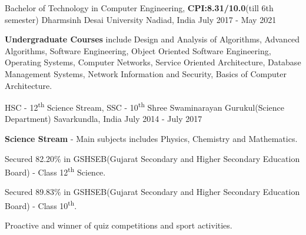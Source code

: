 
\begin{cventries}
  \cventry
    {Bachelor of Technology in Computer Engineering, \textbf{CPI:8.31/10.0}(till 6th semester)} %
    {Dharmsinh Desai University} %
    {Nadiad, India} %
    {July 2017 - May 2021} %
    {
      \begin{cvitems} %
         \item {\textbf{Undergraduate Courses} include Design and Analysis of Algorithms, Advanced Algorithms, Software Engineering, Object Oriented
Software Engineering, Operating Systems, Computer Networks, Service Oriented Architecture, Database Management Systems,
Network Information and Security, Basics of Computer Architecture.}
         \vspace{0.5mm}
      \end{cvitems}
    }
    
\end{cventries}
\begin{cventries}
  \cventry
    {HSC - 12\textsuperscript{th} Science Stream, SSC - 10\textsuperscript{th}} %
    {Shree Swaminarayan Gurukul(Science Department)} %
    {Savarkundla, India} %
    {July 2014 - July 2017} %
    {
      \begin{cvitems} %
         \item {\textbf{Science Stream} -  Main subjects includes Physics, Chemistry and Mathematics.}
         \vspace{0.5mm}
          \item {Secured 82.20\% in GSHSEB(Gujarat Secondary and Higher Secondary Education Board) - Class 12\textsuperscript{th} Science.}
          \vspace{0.5mm}
          \item {Secured 89.83\% in GSHSEB(Gujarat Secondary and Higher Secondary Education Board) - Class 10\textsuperscript{th}.}
          \vspace{0.5mm}
          \item {Proactive and winner of quiz competitions and sport activities.}
          \vspace{0.5mm}
      \end{cvitems}
    }
    
\end{cventries}
